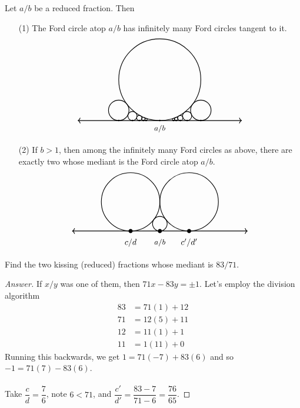 \begin{corollary}
Let $a/b$ be a reduced fraction. Then
\begin{itemize}
\item[(1)] The Ford circle atop $a/b$ has infinitely many Ford circles tangent to it.
\[\begin{tikzpicture}[scale=3.5]
    \draw[thick](-2,0.5) circle (0.5);
    \draw[thick](-1.5,0.125) circle (0.125);
    \draw[thick](-1.66666,0.0555) circle (0.0555);
    \draw[thick](-1.75,0.03125) circle (0.03125);
    \draw[thick](-1.8,0.02) circle (0.02);
    \draw[thick](-1.8333,0.013889) circle (0.013889);
    \draw[thick](-2.5,0.125) circle (0.125);
    \draw[thick](-2.333,0.0555) circle (0.0555);
    \draw[thick](-2.25,0.03125) circle (0.03125);
    \draw[thick](-2.2,0.02) circle (0.02);
    \draw[thick](-2.1666,0.013889) circle (0.013889);
    \draw[<->,thick] (-3,0)--(-1,0);
    \foreach \x in {-2,-1.5,-1.66666,-1.75,-1.8,-1.8333,-2.5,-2.333,-2.25,-2.2,-2.1666}
    {
    \fill (\x,0) circle (0.25pt);
    }
    \node[] at (-2,-0.1) {\small $a/b$};
\end{tikzpicture}\]
\item[(2)] If $b>1$, then among the infinitely many Ford circles as above, there are exactly two whose mediant is the Ford circle atop $a/b$.
\[\begin{tikzpicture}[scale=2.5]
    \draw[thick](-2,0.5) circle (0.5);
    \draw[thick](-1,0.5) circle (0.5);
    \draw[thick](-1.5,0.125) circle (0.125);
    \draw[<->,thick] (-3,0)--(0,0);
    \foreach \x in {-2,-1,-1.5}
    {
    \fill (\x,0) circle (1pt);
    }
    \node[] at (-1,-0.2) {$c'/d'$};
    \node[] at (-2,-0.2) {$c/d$};
    \node[] at (-1.5,-0.2) {\small $a/b$};
\end{tikzpicture}\]
\end{itemize}
\end{corollary}

\vspace*{1em}

\begin{example}
Find the two kissing (reduced) fractions whose mediant is $83/71$.
\end{example}
\begin{proof}[Answer]
If $x/y$ was one of them, then $71x - 83y = \pm 1$. Let's employ the division algorithm
\begin{align*}
83 &= 71(1) + 12\\[0.5em]
71 &= 12(5) + 11\\[0.5em]
12 &= 11(1) + 1\\[0.5em]
11 &= 1(11) + 0
\end{align*}
Running this backwards, we get $1 = 71 (-7) + 83 (6)$ and so $-1 = 71(7) - 83(6)$.\\
\\
Take $\dfrac{c}{d} = \dfrac{7}{6}$, note $6 < 71$, and $\dfrac{c'}{d'} = \dfrac{83-7}{71-6} = \dfrac{76}{65}$.
\end{proof}

